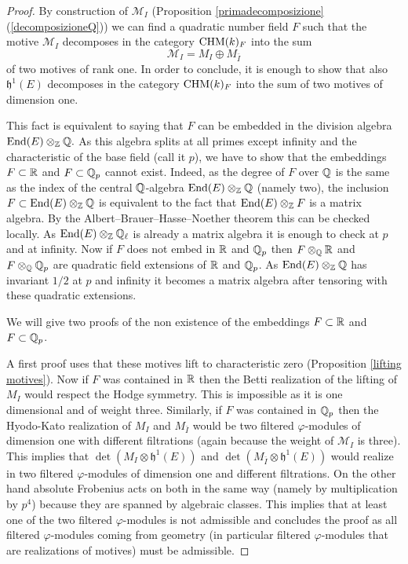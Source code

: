 \documentclass[11pt]{amsart}
\begin{document}
\begin{proof}

By construction of   $\mathcal{M}_I$ (Proposition  \ref{primadecomposizione}(\ref{decomposizioneQ})) we can find a quadratic number field $F$  such that the motive $\mathcal{M}_{I} $  decomposes in the category $\mathrm{CHM} (k)_{F}$ into the sum 
\[\mathcal{M}_{I} = M_{I} \oplus  M_{\bar{I}}  \] of two motives of rank one. In order to conclude, it is enough to show that also $\mathfrak{h}^1(E)$  decomposes in the category $\mathrm{CHM} (k)_{F}$ into the sum of two motives of dimension one. 

This fact is equivalent to saying that $F$ can be embedded in the division algebra $\textnormal{End}(E)\otimes_{\mathbb{Z}} \mathbb{Q}.$ As this algebra splits at all primes except infinity and  the characteristic of the base field (call it $p$), we have to show that the embeddings $F \subset \mathbb{R}$ and $F\subset \mathbb{Q}_p$ cannot exist. Indeed, as the degree of $F$ over $\mathbb{Q}$ is the same as the index of the central $\mathbb{Q}$-algebra $\textnormal{End}(E)\otimes_{\mathbb{Z}} \mathbb{Q}$ (namely two), the inclusion  $F\subset\textnormal{End}(E)\otimes_{\mathbb{Z}} \mathbb{Q}$ is equivalent to the fact that $\textnormal{End}(E)\otimes_{\mathbb{Z}} F$ is a matrix algebra. By the Albert--Brauer--Hasse--Noether theorem this can be checked locally. As $\textnormal{End}(E)\otimes_{\mathbb{Z}} \mathbb{Q}_\ell$ is already a matrix algebra it is enough to check at $p$ and at infinity. Now if $F $ does not embed in $\mathbb{R}$ and $\mathbb{Q}_p$ then $F\otimes_{\mathbb{Q}} \mathbb{R}$ and $F\otimes_{\mathbb{Q}}\mathbb{Q}_p$ are quadratic field extensions of $\mathbb{R}$ and $\mathbb{Q}_p$. As $\textnormal{End}(E)\otimes_{\mathbb{Z}} \mathbb{Q}$ has invariant $1/2$ at $p$ and infinity it becomes a matrix algebra after tensoring with these quadratic extensions.

We will give two proofs of the non existence of the embeddings $F \subset \mathbb{R}$ and $F\subset \mathbb{Q}_p$.

A first proof uses that these motives lift to characteristic zero (Proposition \ref{lifting motives}). 
Now if $F$ was contained in $\mathbb{R}$ then the Betti realization of the lifting of $M_{I}$ would respect the Hodge symmetry. This is impossible as it is one dimensional and of weight three. Similarly, if $F$ was contained in $\mathbb{Q}_p$ then the Hyodo-Kato realization of $M_{I}$ and $M_{\bar{I}} $ would be two filtered $\varphi$-modules of dimension one with different filtrations (again because the weight of $\mathcal{M}_{I}$ is three). This implies that  
$\det (M_{I}  \otimes \mathfrak{h}^1(E))$ and $\det(M_{\bar{I}}  \otimes \mathfrak{h}^1(E))$ would realize in two filtered $\varphi$-modules of dimension one and different filtrations.  On the other hand   absolute Frobenius acts on both   in the same way (namely by multiplication by $p^4$) because they are spanned by algebraic classes. This implies that at least one of the two filtered $\varphi$-modules is not admissible and concludes the proof as all filtered $\varphi$-modules coming from geometry (in particular filtered $\varphi$-modules that are realizations of motives) must be admissible.


\end{proof}
\end{document}
